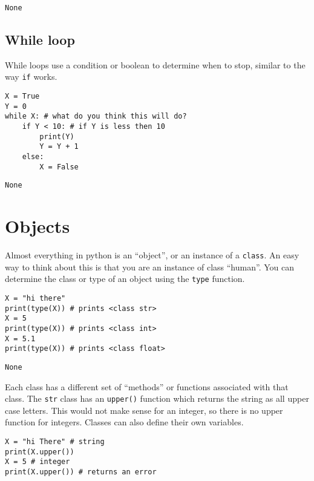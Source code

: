 \documentclass{assignments}
\begin{document}
\begin{verbatim}
None
\end{verbatim}

\subsection*{While loop}
\label{sec:org7438c1a}
While loops use a condition or boolean to determine when to stop, similar to the
way \texttt{if} works.
\begin{verbatim}
X = True
Y = 0
while X: # what do you think this will do?
    if Y < 10: # if Y is less then 10
        print(Y)
        Y = Y + 1
    else:
        X = False

\end{verbatim}

\begin{verbatim}
None
\end{verbatim}

\section*{Objects}
\label{sec:orgd43b6fa}
Almost everything in python is an ``object'', or an instance of a \texttt{class}. An easy
way to think about this is that you are an instance of class ``human''. You can
determine the class or type of an object using the \texttt{type} function.
\begin{verbatim}
X = "hi there"
print(type(X)) # prints <class str>
X = 5
print(type(X)) # prints <class int>
X = 5.1
print(type(X)) # prints <class float>
\end{verbatim}

\begin{verbatim}
None
\end{verbatim}


Each class has a different set of ``methods'' or functions associated with that
class. The \texttt{str} class has an \texttt{upper()} function which returns the string as all
upper case letters. This would not make sense for an integer, so there is no
upper function for integers. Classes can also define their own variables.
\begin{verbatim}
X = "hi There" # string
print(X.upper())
X = 5 # integer
print(X.upper()) # returns an error
\end{verbatim}
\end{document}
